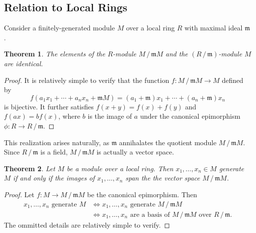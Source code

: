 \documentclass[11pt]{article}
\newtheorem{theorem}{Theorem}
\begin{document}

\subsection{Relation to Local Rings}

Consider a finitely-generated module $M$ over a local ring $R$ with maximal ideal $\mathfrak{m}$. 

\begin{adjustwidth}{0.5cm}{}
	\begin{theorem}
		The elements of the $R$-module $M \,/\, \mathfrak{m} M$ and the $(R \,/\, \mathfrak{m})$-module $M$ are identical.
	\end{theorem}
	\begin{proof}
		It is relatively simple to verify that the function $f : M \,/\, \mathfrak{m} M \to M$ defined by
		\[
			f(a_{1} x_{1} + \cdots + a_{n} x_{n} + \mathfrak{m}M) = (a_{1} + \mathfrak{m})x_{1} + \cdots + (a_{n} + \mathfrak{m})x_{n}
		\]
		is bijective. It further satisfies $f(x + y) = f(x) + f(y)$ and $f(ax) = b f(x)$, where $b$ is the image of $a$ under the canonical epimorphism $\phi : R \to R \,/\, \mathfrak{m}$.
	\end{proof}
\end{adjustwidth}

This realization arises naturally, as $\mathfrak{m}$ annihalates the quotient module $M \,/\, \mathfrak{m} M$. Since $R \,/\, \mathfrak{m}$ is a field, $M \,/\, \mathfrak{m} M$ is actually a vector space.

\begin{adjustwidth}{0.5cm}{}
	\begin{theorem}
		Let $M$ be a module over a local ring. Then $x_{1}, \ldots, x_{n} \in M$ generate $M$ if and only if the images of $x_{1}, \ldots, x_{n}$ span the the vector space $M \,/\, \mathfrak{m} M$.
	\end{theorem}
	\begin{proof}
		Let $f : M \to M \,/\, \mathfrak{m} M$ be the canonical epimorphism. Then
		\begin{align*}
			\text{$x_{1}, \ldots, x_{n}$ generate $M$} &\iff \text{$x_{1}, \ldots, x_{n}$ generate $M \,/\, \mathfrak{m} M$} \\
			&\iff \text{$x_{1}, \ldots, x_{n}$ are a basis of $M \,/\, \mathfrak{m} M$ over $R \,/\, \mathfrak{m}$}.
		\end{align*}
		The ommitted details are relatively simple to verify.
	\end{proof}
\end{adjustwidth}
\end{document}
